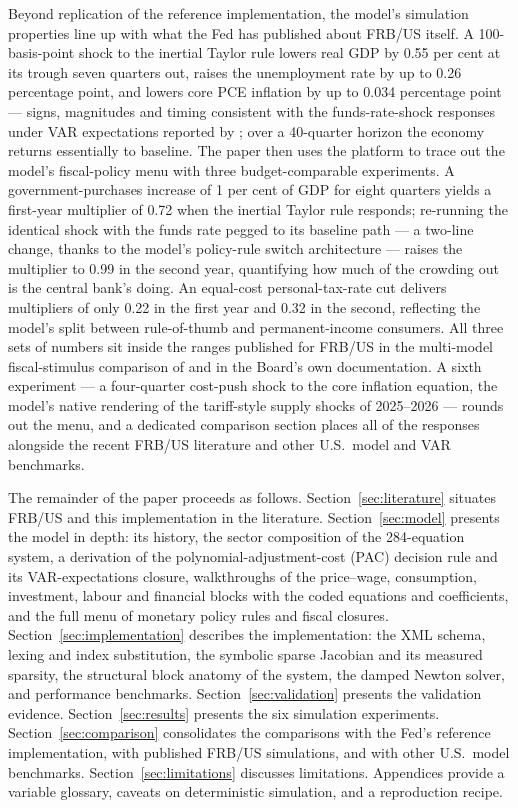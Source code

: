 Beyond replication of the reference implementation, the model's simulation properties line up with what the Fed has published about FRB/US itself. A 100-basis-point shock to the inertial Taylor rule lowers real GDP by 0.55 per cent at its trough seven quarters out, raises the unemployment rate by up to 0.26 percentage point, and lowers core PCE inflation by up to 0.034 percentage point --- signs, magnitudes and timing consistent with the funds-rate-shock responses under VAR expectations reported by \citet{brayton2014note}; over a 40-quarter horizon the economy returns essentially to baseline. The paper then uses the platform to trace out the model's fiscal-policy menu with three budget-comparable experiments. A government-purchases increase of 1 per cent of GDP for eight quarters yields a first-year multiplier of 0.72 when the inertial Taylor rule responds; re-running the identical shock with the funds rate pegged to its baseline path --- a two-line change, thanks to the model's policy-rule switch architecture --- raises the multiplier to 0.99 in the second year, quantifying how much of the crowding out is the central bank's doing. An equal-cost personal-tax-rate cut delivers multipliers of only 0.22 in the first year and 0.32 in the second, reflecting the model's split between rule-of-thumb and permanent-income consumers. All three sets of numbers sit inside the ranges published for FRB/US in the multi-model fiscal-stimulus comparison of \citet{coenen2012effects} and in the Board's own documentation. A sixth experiment --- a four-quarter cost-push shock to the core inflation equation, the model's native rendering of the tariff-style supply shocks of 2025--2026 --- rounds out the menu, and a dedicated comparison section places all of the responses alongside the recent FRB/US literature and other U.S.\ model and VAR benchmarks.

The remainder of the paper proceeds as follows. Section~\ref{sec:literature} situates FRB/US and this implementation in the literature. Section~\ref{sec:model} presents the model in depth: its history, the sector composition of the 284-equation system, a derivation of the polynomial-adjustment-cost (PAC) decision rule and its VAR-expectations closure, walkthroughs of the price--wage, consumption, investment, labour and financial blocks with the coded equations and coefficients, and the full menu of monetary policy rules and fiscal closures. Section~\ref{sec:implementation} describes the implementation: the XML schema, lexing and index substitution, the symbolic sparse Jacobian and its measured sparsity, the structural block anatomy of the system, the damped Newton solver, and performance benchmarks. Section~\ref{sec:validation} presents the validation evidence. Section~\ref{sec:results} presents the six simulation experiments. Section~\ref{sec:comparison} consolidates the comparisons with the Fed's reference implementation, with published FRB/US simulations, and with other U.S.\ model benchmarks. Section~\ref{sec:limitations} discusses limitations. Appendices provide a variable glossary, caveats on deterministic simulation, and a reproduction recipe.

